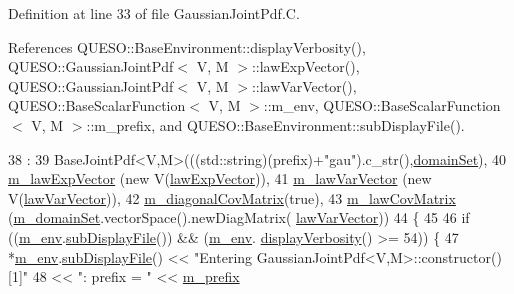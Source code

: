 Definition at line 33 of file Gaussian\-Joint\-Pdf.\-C.



References Q\-U\-E\-S\-O\-::\-Base\-Environment\-::display\-Verbosity(), Q\-U\-E\-S\-O\-::\-Gaussian\-Joint\-Pdf$<$ V, M $>$\-::law\-Exp\-Vector(), Q\-U\-E\-S\-O\-::\-Gaussian\-Joint\-Pdf$<$ V, M $>$\-::law\-Var\-Vector(), Q\-U\-E\-S\-O\-::\-Base\-Scalar\-Function$<$ V, M $>$\-::m\-\_\-env, Q\-U\-E\-S\-O\-::\-Base\-Scalar\-Function$<$ V, M $>$\-::m\-\_\-prefix, and Q\-U\-E\-S\-O\-::\-Base\-Environment\-::sub\-Display\-File().


\begin{DoxyCode}
38   :
39   BaseJointPdf<V,M>(((std::string)(prefix)+\textcolor{stringliteral}{"gau"}).c\_str(),\hyperlink{class_q_u_e_s_o_1_1_base_scalar_function_ad0937628825249dd36ded3ce0c7959ac}{domainSet}),
40   \hyperlink{class_q_u_e_s_o_1_1_gaussian_joint_pdf_a8ef2407f5234ce5e0ed0d05a21f183e5}{m\_lawExpVector}     (\textcolor{keyword}{new} V(\hyperlink{class_q_u_e_s_o_1_1_gaussian_joint_pdf_a927c7abde2026d17586013a04a0a053e}{lawExpVector})),
41   \hyperlink{class_q_u_e_s_o_1_1_gaussian_joint_pdf_a35008ff77d5f572a7ee58fef4bfc536d}{m\_lawVarVector}     (\textcolor{keyword}{new} V(\hyperlink{class_q_u_e_s_o_1_1_gaussian_joint_pdf_ae7af4530bc9394393f3383b6321bc839}{lawVarVector})),
42   \hyperlink{class_q_u_e_s_o_1_1_gaussian_joint_pdf_a7e18c86c60bd7dc4ceaadaab618c3241}{m\_diagonalCovMatrix}(\textcolor{keyword}{true}),
43   \hyperlink{class_q_u_e_s_o_1_1_gaussian_joint_pdf_af13b72027783d8db03721951a71087d8}{m\_lawCovMatrix}     (\hyperlink{class_q_u_e_s_o_1_1_base_scalar_function_a67696e86211197938c72cd11863f5cf8}{m\_domainSet}.vectorSpace().newDiagMatrix(
      \hyperlink{class_q_u_e_s_o_1_1_gaussian_joint_pdf_ae7af4530bc9394393f3383b6321bc839}{lawVarVector}))
44 \{
45 
46   \textcolor{keywordflow}{if} ((\hyperlink{class_q_u_e_s_o_1_1_base_scalar_function_adf44141aeb765d97613286f88f235f04}{m\_env}.\hyperlink{class_q_u_e_s_o_1_1_base_environment_a8a0064746ae8dddfece4229b9ad374d6}{subDisplayFile}()) && (\hyperlink{class_q_u_e_s_o_1_1_base_scalar_function_adf44141aeb765d97613286f88f235f04}{m\_env}.
      \hyperlink{class_q_u_e_s_o_1_1_base_environment_a1fe5f244fc0316a0ab3e37463f108b96}{displayVerbosity}() >= 54)) \{
47     *\hyperlink{class_q_u_e_s_o_1_1_base_scalar_function_adf44141aeb765d97613286f88f235f04}{m\_env}.\hyperlink{class_q_u_e_s_o_1_1_base_environment_a8a0064746ae8dddfece4229b9ad374d6}{subDisplayFile}() << \textcolor{stringliteral}{"Entering GaussianJointPdf<V,M>::constructor() [1]"}
48                             << \textcolor{stringliteral}{": prefix = "} << \hyperlink{class_q_u_e_s_o_1_1_base_scalar_function_a6e81dc902aca6a546877da99b2f4a169}{m\_prefix}

\end{DoxyCode}
